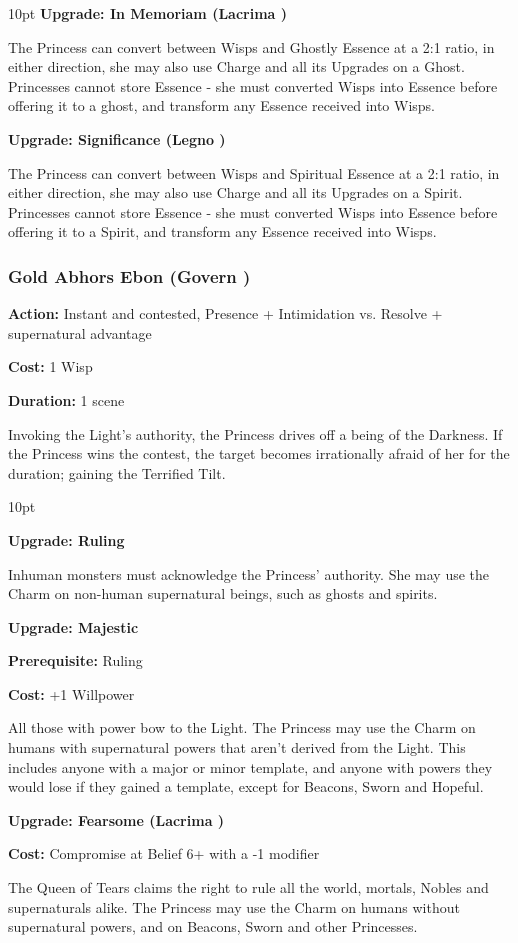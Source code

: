 \begin{myindentpar}{10pt}
\textbf{Upgrade: In Memoriam (Lacrima \textbullet\textbullet)}

The Princess can convert between Wisps and Ghostly Essence at a 2:1 ratio, in either direction, she may also use Charge and all its Upgrades on a Ghost. Princesses cannot store Essence - she must converted Wisps into Essence before offering it to a ghost, and transform any Essence received into Wisps.

\textbf{Upgrade: Significance (Legno \textbullet\textbullet)}

The Princess can convert between Wisps and Spiritual Essence at a 2:1 ratio, in either direction, she may also use Charge and all its Upgrades on a Spirit. Princesses cannot store Essence - she must converted Wisps into Essence before offering it to a Spirit, and transform any Essence received into Wisps.\end{myindentpar}

\subsubsection*{Gold Abhors Ebon (Govern \textbullet\textbullet)}

\noindent \textbf{Action:} Instant and contested, Presence + Intimidation vs. Resolve + supernatural advantage

\noindent \textbf{Cost:} 1 Wisp

\noindent \textbf{Duration:} 1 scene

\noindent Invoking the Light's authority, the Princess drives off a being of the Darkness. If the Princess wins the contest, the target becomes irrationally afraid of her for the duration; gaining the Terrified Tilt.

\begin{myindentpar}{10pt}

\textbf{Upgrade: Ruling}

Inhuman monsters must acknowledge the Princess' authority. She may use the Charm on non-human supernatural beings, such as ghosts and spirits.

\textbf{Upgrade: Majestic}

\noindent \textbf{Prerequisite:} Ruling

\noindent \textbf{Cost:} +1 Willpower

All those with power bow to the Light. The Princess may use the Charm on humans with supernatural powers that aren't derived from the Light. This includes anyone with a major or minor template, and anyone with powers they would lose if they gained a template, except for Beacons, Sworn and Hopeful.

\textbf{Upgrade: Fearsome (Lacrima \textbullet\textbullet)}

\noindent \textbf{Cost:} Compromise at Belief 6+ with a -1 modifier

The Queen of Tears claims the right to rule all the world, mortals, Nobles and supernaturals alike. The Princess may use the Charm on humans without supernatural powers, and on Beacons, Sworn and other Princesses.\end{myindentpar}



